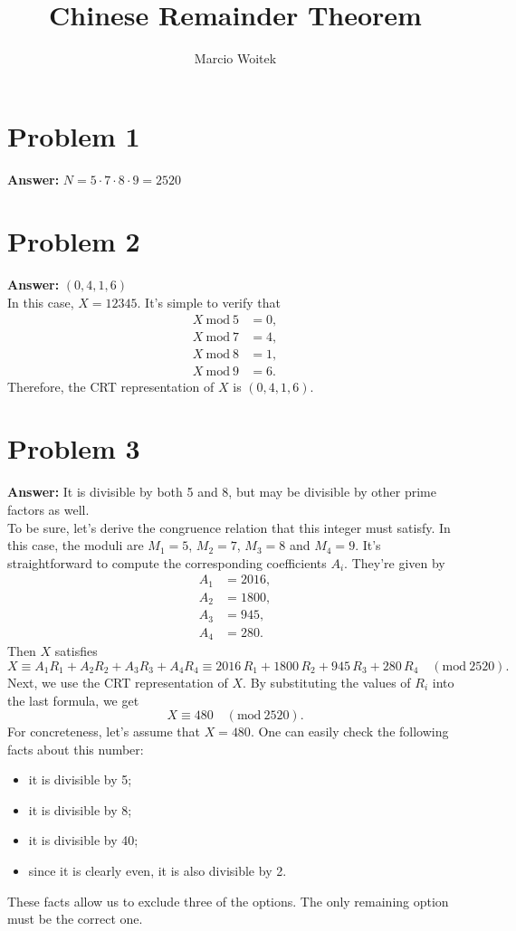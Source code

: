 \documentclass[11pt]{article}
\author{Marcio Woitek}
\date{}
\title{Chinese Remainder Theorem}
\newcommand{\Mod}{\mathrm{mod}\:}
\begin{document}
\maketitle
\thispagestyle{empty}
\pagestyle{empty}
\section*{Problem 1}
\label{sec:org5e7123d}
\textbf{Answer:} \(N=5\cdot 7\cdot 8\cdot 9=2520\)
\section*{Problem 2}
\label{sec:orgfb1c2f3}
\textbf{Answer:} \((0,4,1,6)\)\\

In this case, \(X=12345\). It's simple to verify that
\begin{align}
X\:\Mod 5&=0,\\
X\:\Mod 7&=4,\\
X\:\Mod 8&=1,\\
X\:\Mod 9&=6.
\end{align}
Therefore, the CRT representation of \(X\) is \((0,4,1,6)\).
\section*{Problem 3}
\label{sec:orgc92313a}
\textbf{Answer:} It is divisible by both 5 and 8, but may be divisible by other prime
factors as well.\\

To be sure, let's derive the congruence relation that this integer must satisfy.
In this case, the moduli are \(M_1=5\), \(M_2=7\), \(M_3=8\) and \(M_4=9\).
It's straightforward to compute the corresponding coefficients \(A_i\).
They're given by
\begin{align}
A_1&=2016,\\
A_2&=1800,\\
A_3&=945,\\
A_4&=280.
\end{align}
Then \(X\) satisfies
\begin{equation}
X\equiv A_1 R_1+A_2 R_2+A_3 R_3+A_4 R_4\equiv 2016\,R_1+1800\,R_2+945\,R_3+280\,R_4\quad(\Mod 2520).
\end{equation}
Next, we use the CRT representation of \(X\). By substituting the values of
\(R_i\) into the last formula, we get
\begin{equation}
X\equiv 480\quad(\Mod 2520).
\end{equation}
For concreteness, let's assume that \(X=480\). One can easily check the
following facts about this number:
\begin{itemize}
\item it is divisible by 5;
\item it is divisible by 8;
\item it is divisible by 40;
\item since it is clearly even, it is also divisible by 2.
\end{itemize}
These facts allow us to exclude three of the options. The only remaining option
must be the correct one.
\end{document}
